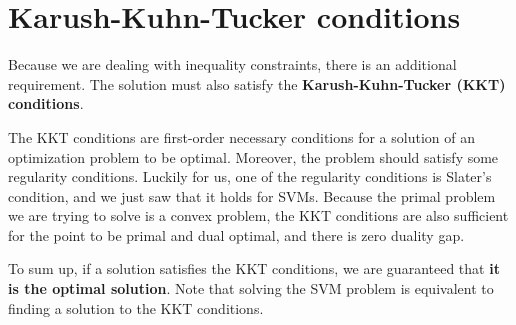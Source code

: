 \section{Karush-Kuhn-Tucker conditions }
Because we are dealing with inequality constraints, there is an additional requirement. The solution must also satisfy the \textbf{Karush-Kuhn-Tucker (KKT) conditions}. 

The KKT conditions are first-order necessary conditions for a solution of an optimization problem to be optimal. Moreover, the problem should satisfy some regularity conditions. Luckily for us, one of the regularity conditions is Slater’s condition, and we just saw that it holds for SVMs. Because the primal problem we are trying to solve is a convex problem, the KKT conditions are also sufficient for the point to be primal and dual optimal, and there is zero duality gap. 

To sum up, if a solution satisfies the KKT conditions, we are guaranteed that \textbf{it is the optimal solution}. Note that solving the SVM problem is equivalent to finding a solution to the KKT conditions. 



